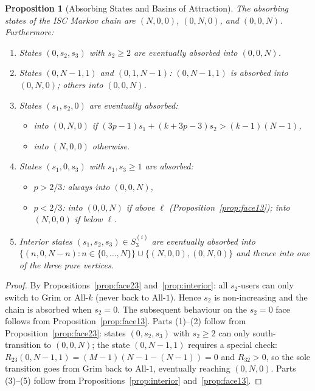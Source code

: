 \documentclass[12pt,a4paper]{article}
\newtheorem{proposition}{Proposition}[section]
\begin{document}
\begin{proposition}[Absorbing States and Basins of Attraction]\label{prop:basins}
The absorbing states of the ISC Markov chain are $(N,0,0)$, $(0,N,0)$, and
$(0,0,N)$. Furthermore:
\begin{enumerate}
  \item States $(0,s_2,s_3)$ with $s_2\geq 2$ are eventually absorbed into $(0,0,N)$.
  \item States $(0,N-1,1)$ and $(0,1,N-1)$: $(0,N-1,1)$ is absorbed into $(0,N,0)$; others into $(0,0,N)$.
  \item States $(s_1,s_2,0)$ are eventually absorbed:
    \begin{itemize}
      \item into $(0,N,0)$ if $(3p-1)s_1+(k+3p-3)s_2>(k-1)(N-1)$,
      \item into $(N,0,0)$ otherwise.
    \end{itemize}
  \item States $(s_1,0,s_3)$ with $s_1,s_3\geq 1$ are absorbed:
    \begin{itemize}
      \item $p>2/3$: always into $(0,0,N)$,
      \item $p<2/3$: into $(0,0,N)$ if above $\ell$ (Proposition~\ref{prop:face13});
            into $(N,0,0)$ if below $\ell$.
    \end{itemize}
  \item Interior states $(s_1,s_2,s_3)\in S_3^{(i)}$ are eventually absorbed
        into $\{(n,0,N-n):n\in\{0,\ldots,N\}\}\cup\{(N,0,0),(0,N,0)\}$
        and thence into one of the three pure vertices.
\end{enumerate}
\end{proposition}

\begin{proof}
By Propositions~\ref{prop:face23} and~\ref{prop:interior}: all $s_2$-users can only
switch to Grim or All-$k$ (never back to All-$1$). Hence $s_2$ is
non-increasing and the chain is absorbed when $s_2=0$. The subsequent
behaviour on the $s_2=0$ face follows from Proposition~\ref{prop:face13}.
Parts (1)--(2) follow from Proposition~\ref{prop:face23}: states $(0,s_2,s_3)$
with $s_2\geq 2$ can only south-transition to $(0,0,N)$; the state $(0,N-1,1)$
requires a special check: $R_{23}(0,N-1,1)=(M-1)(N-1-(N-1))=0$ and
$R_{32}>0$, so the sole transition goes from Grim back to All-$1$, eventually
reaching $(0,N,0)$.
Parts (3)--(5) follow from Propositions~\ref{prop:interior} and~\ref{prop:face13}.
\end{proof}
\end{document}
